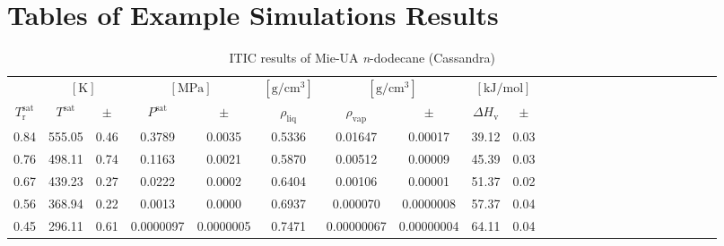 \documentclass[%
 aip,
 jcp,
 sd,%
 amsmath,amssymb,
]{revtex4-1}
\begin{document}
\section{Tables of Example Simulations Results}
\begin{table*}[!htbp]
\centering
\caption{
ITIC results of Mie-UA \textit{n}-dodecane (Cassandra)
}
\label{tab:Mie-C12-mie}
\begin{ruledtabular}
\begin{tabular}{cccccccccccccccccccccccc}
 & \multicolumn{2}{c}{$[\mathrm{K}]$} &	 \multicolumn{2}{c}{$[\mathrm{MPa}]$} & $[\mathrm{g/cm^3}]$ & \multicolumn{2}{c}{$[\mathrm{g/cm^3}]$} & \multicolumn{2}{c}{$[\mathrm{kJ/mol}]$} \\
$T_\mathrm{r}^{\mathrm{sat}}$ & $T^{\mathrm{sat}}$ & $\pm$ & $P^{\mathrm{sat}}$ & $\pm$ & $\rho_{\mathrm{liq}}$ & $\rho_{\mathrm{vap}}$ & $\pm$ & $\Delta H_{\mathrm{v}}$ & $\pm$
 \\
\hline		
0.84	&	555.05	&	0.46	&	0.3789	&	0.0035	&	0.5336	&	0.01647	&	0.00017	&	39.12	&	0.03	\\
0.76	&	498.11	&	0.74	&	0.1163	&	0.0021	&	0.5870	&	0.00512	&	0.00009	&	45.39	&	0.03	\\
0.67	&	439.23	&	0.27	&	0.0222	&	0.0002	&	0.6404	&	0.00106	&	0.00001	&	51.37	&	0.02	\\
0.56	&	368.94	&	0.22	&	0.0013	&	0.0000	&	0.6937	&	0.000070	&	0.0000008	&	57.37	&	0.04	\\
0.45	&	296.11	&	0.61	&	0.0000097	&	0.0000005	&	0.7471	&	0.00000067	&	0.00000004	&	64.11	&	0.04	\\
\end{tabular}
\end{ruledtabular}
\end{table*}
\end{document}

